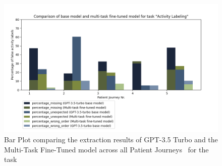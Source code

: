\begin{figure}
    \centering
    \includegraphics[width=\textwidth]{bachelor_thesis/images/activities_all.png}
    \caption{Bar Plot comparing the extraction results of GPT-3.5 Turbo and the Multi-Task Fine-Tuned model across all Patient Journeys~ for the task } 
    \label{fig:eval_activities_bar}
\end{figure}

